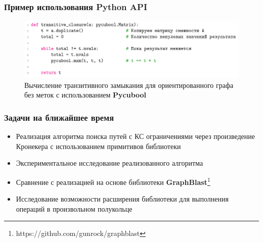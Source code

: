 \documentclass[xcolor=table,english]{beamer}
\begin{document}
\begin{frame}[fragile] \frametitle{Пример использования Python API}
    \begin{center}
     \begin{minipage}[m]{0.85\linewidth}
        \begin{figure}
            \centering
            \includegraphics[width=\textwidth]{figures/tc_python_api.png}
            \caption{Вычисление транзитивного замыкания для ориентированного графа без меток с использованием \textbf{Pycubool}}
        \end{figure}
    \end{minipage}\hfill   
    \end{center}
\end{frame}

\begin{frame}[fragile] \frametitle{Задачи на ближайшее время}
    \begin{itemize}
        \item Реализация алгоритма поиска путей с КС ограничениями через произведение Кронекера с использованием примитивов библиотеки
        \item Экспериментальное исследование реализованного алгоритма
        \item Сравнение с реализацией на основе библиотеки  \textbf{GraphBlast}\footnote{https://github.com/gunrock/graphblast}
        \item Исследование возможности расширения библиотеки для выполнения операций в произвольном полукольце
    \end{itemize}
\end{frame}

\end{document}
